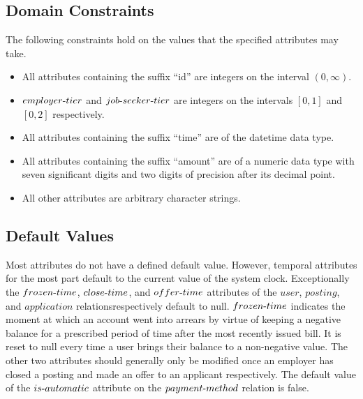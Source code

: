 \documentclass{article}
\newcommand{\tdash}{\textnormal{-}}
\begin{document}
        \subsection{Domain Constraints}
            The following constraints hold on the values that the specified attributes may take.
            \begin{itemize}
                \item All attributes containing the suffix ``id'' are integers on the interval $(0, \infty)$.
                \item $employer \tdash tier$ and $job \tdash seeker \tdash tier$ are integers on the intervals $[0, 1]$
                    and $[0, 2]$ respectively.
                \item All attributes containing the suffix ``time'' are of the datetime data type.
                \item All attributes containing the suffix ``amount'' are of a numeric data type with seven significant
                    digits and two digits of precision after its decimal point.
                \item All other attributes are arbitrary character strings.
            \end{itemize}
        \subsection{Default Values}
            Most attributes do not have a defined default value. However, temporal attributes for the most part default
            to the current value of the system clock. Exceptionally the $frozen\tdash time$, $close \tdash time$, and
            $offer \tdash time$ attributes of the $user$, $posting$, and $application$ relationsrespectively default to
            null. $frozen \tdash time$ indicates the moment at which an account went into arrears by virtue of keeping
            a negative balance for a prescribed period of time after the most recently issued bill. It is reset to null
            every time a user brings their balance to a non-negative value. The other two attributes should generally
            only be modified once an employer has closed a posting and made an offer to an applicant respectively. The
            default value of the $is\tdash automatic$ attribute on the $payment \tdash method$ relation is false.
\end{document}
